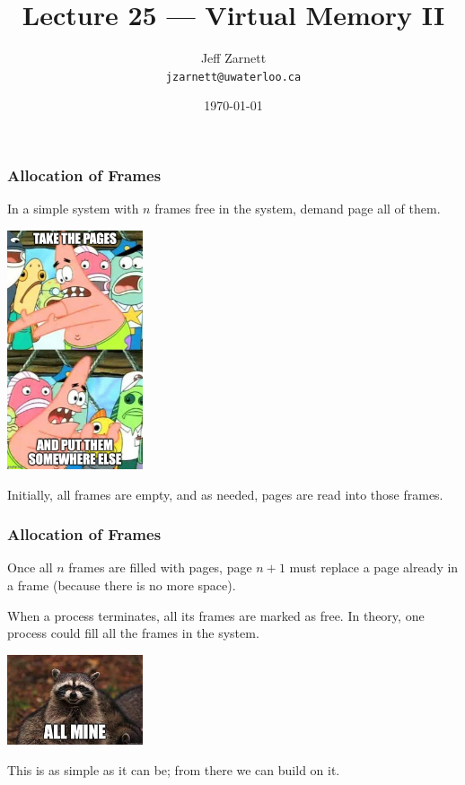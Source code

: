 

\title{Lecture 25 --- Virtual Memory II }

\author{Jeff Zarnett \\ \small \texttt{jzarnett@uwaterloo.ca}}
\date{\today}




\begin{frame}
  \titlepage

 \end{frame}


\begin{frame}
\frametitle{Allocation of Frames}

In a simple system with $n$ frames free in the system, demand page all of them. 



\begin{center}
	\includegraphics[width=0.3\textwidth]{images/pages-elsewhere.jpg}
\end{center}

Initially, all frames are empty, and as needed, pages are read into those frames. 

 \end{frame}


\begin{frame}
\frametitle{Allocation of Frames}

Once all $n$ frames are filled with pages, page $n+1$ must replace a page already in a frame (because there is no more space). 

When a process terminates, all its frames are marked as free. In theory, one process could fill all the frames in the system. 

\begin{center}
	\includegraphics[width=0.3\textwidth]{images/allmine.jpg}
\end{center}

This is as simple as it can be; from there we can build on it.


\end{frame}

